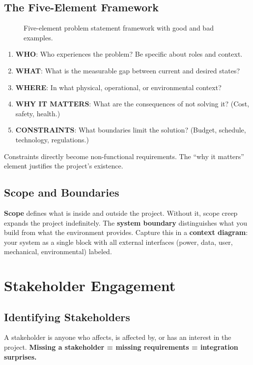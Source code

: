 \subsection{The Five-Element Framework}

\begin{figure}[htbp]\centering

\caption{Five-element problem statement framework with good and bad examples.}\label{fig:prob}
\end{figure}

\begin{enumerate}[leftmargin=1.5em]
\item \textbf{WHO}: Who experiences the problem? Be specific about roles and context.
\item \textbf{WHAT}: What is the measurable gap between current and desired states?
\item \textbf{WHERE}: In what physical, operational, or environmental context?
\item \textbf{WHY IT MATTERS}: What are the consequences of not solving it? (Cost, safety, health.)
\item \textbf{CONSTRAINTS}: What boundaries limit the solution? (Budget, schedule, technology, regulations.)
\end{enumerate}

Constraints directly become non-functional requirements. The ``why it matters'' element justifies the project's existence.

\subsection{Scope and Boundaries}
\textbf{Scope} defines what is inside and outside the project. Without it, scope creep expands the project indefinitely. The \textbf{system boundary} distinguishes what you build from what the environment provides. Capture this in a \textbf{context diagram}: your system as a single block with all external interfaces (power, data, user, mechanical, environmental) labeled.

\section{Stakeholder Engagement}
\subsection{Identifying Stakeholders}
A stakeholder is anyone who affects, is affected by, or has an interest in the project. \textbf{Missing a stakeholder = missing requirements = integration surprises.}

